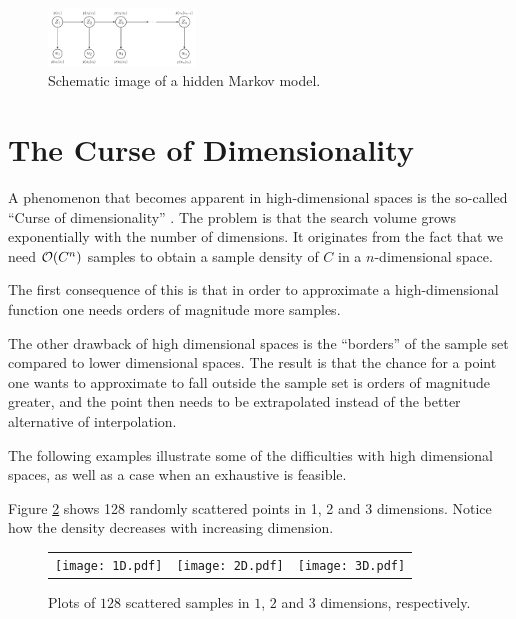 \begin{figure}
  \centering
  \includegraphics[width=0.35\textwidth]{hmm-graph.pdf}
  \caption{Schematic image of a hidden Markov model.}
  \label{fig:hmm-graph}
\end{figure}


\section{The Curse of Dimensionality} A phenomenon that becomes
apparent in high-dimensional spaces is the so-called ``Curse of
dimensionality'' \cite{EncyclopediaMachineLearning}.  The problem is
that the search volume grows exponentially with the number of
dimensions.  It originates from the fact that we need $\mathcal{O}{\left(C^n\right)}$
samples to obtain a sample density of $C$ in a $n$-dimensional space.

The first consequence of this is that in order to approximate a
high-dimensional function one needs orders of magnitude more samples.

The other drawback of high dimensional spaces is the ``borders'' of
the sample set compared to lower dimensional spaces. The result is
that the chance for a point one wants to approximate to fall outside
the sample set is orders of magnitude greater, and the point then
needs to be extrapolated instead of the better alternative of
interpolation.

The following examples illustrate some of the difficulties with high
dimensional spaces, as well as a case when an exhaustive is feasible.

\begin{example} Figure \ref{fig:curse-of-dimensionality} shows 128
randomly scattered points in 1, 2 and 3 dimensions. Notice how the
density decreases with increasing dimension.
  \begin{figure}
    \begin{tabular}{rcl}
      \texttt{[image: 1D.pdf]}&
      \texttt{[image: 2D.pdf]}&
      \texttt{[image: 3D.pdf]}
    \end{tabular}
    \caption{Plots of $128$ scattered samples in $1$, $2$ and $3$
dimensions, respectively.}
    \label{fig:curse-of-dimensionality}
  \end{figure}
\end{example}

